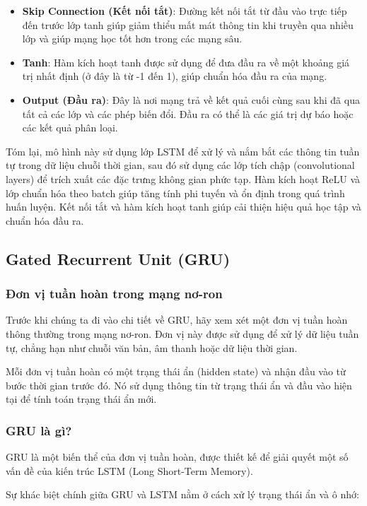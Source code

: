 \documentclass[conference]{IEEEtran}
\begin{document}
\begin{itemize}
    \item \textbf{Skip Connection (Kết nối tắt)}: Đường kết nối tắt từ đầu vào trực tiếp đến trước lớp tanh giúp giảm thiểu mất mát thông tin khi truyền qua nhiều lớp và giúp mạng học tốt hơn trong các mạng sâu.

    \item \textbf{Tanh}: Hàm kích hoạt tanh được sử dụng để đưa đầu ra về một khoảng giá trị nhất định (ở đây là từ -1 đến 1), giúp chuẩn hóa đầu ra của mạng.

    \item \textbf{Output (Đầu ra)}: Đây là nơi mạng trả về kết quả cuối cùng sau khi đã qua tất cả các lớp và các phép biến đổi. Đầu ra có thể là các giá trị dự báo hoặc các kết quả phân loại.
\end{itemize}

Tóm lại, mô hình này sử dụng lớp LSTM để xử lý và nắm bắt các thông tin tuần tự trong dữ liệu chuỗi thời gian, sau đó sử dụng các lớp tích chập (convolutional layers) để trích xuất các đặc trưng không gian phức tạp. Hàm kích hoạt ReLU và lớp chuẩn hóa theo batch giúp tăng tính phi tuyến và ổn định trong quá trình huấn luyện. Kết nối tắt và hàm kích hoạt tanh giúp cải thiện hiệu quả học tập và chuẩn hóa đầu ra.
\subsection{Gated Recurrent Unit (GRU)}
\subsubsection{Đơn vị tuần hoàn trong mạng nơ-ron}
Trước khi chúng ta đi vào chi tiết về GRU, hãy xem xét một đơn vị tuần hoàn thông thường trong mạng nơ-ron. Đơn vị này được sử dụng để xử lý dữ liệu tuần tự, chẳng hạn như chuỗi văn bản, âm thanh hoặc dữ liệu thời gian.

Mỗi đơn vị tuần hoàn có một trạng thái ẩn (hidden state) và nhận đầu vào từ bước thời gian trước đó. Nó sử dụng thông tin từ trạng thái ẩn và đầu vào hiện tại để tính toán trạng thái ẩn mới.

\subsubsection{GRU là gì?}
GRU là một biến thể của đơn vị tuần hoàn, được thiết kế để giải quyết một số vấn đề của kiến trúc LSTM (Long Short-Term Memory).

Sự khác biệt chính giữa GRU và LSTM nằm ở cách xử lý trạng thái ẩn và ô nhớ:
\end{document}
